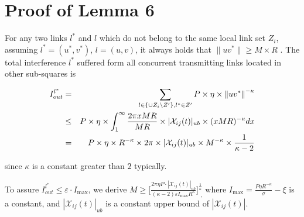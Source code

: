 \documentclass[journal]{IEEEtran}
\begin{document}
\section{Proof of Lemma 6}
\begin{IEEEproof}
For any two links $l^*$ and $ l$ which do not belong to the same local link set $Z_i$, assuming $l^*=(u^*, v^*)$,
$l=(u,v)$, it always holds that
   $\|uv^*\| \ge M \times R \mbox{~.}$
The total interference $l^*$ suffered form all concurrent transmitting links located in other sub-squares is

\vspace*{-0.5\baselineskip}
\begin{eqnarray*}
    I_{out}^ {l^\ast }
    &  =  & \sum\limits_{l\in \{\cup Z_i \backslash Z'\},l^\ast \in Z'}
                            P \times \eta \times \left\| {uv^\ast }\right\|^{-\kappa } \\
    & \le & P \times \eta \times \int_1^{\infty}{ \frac{2 \pi x M R}{M R} \times |\mathcal{X}_{ij} (t)|_{ub} \times
            (x M R)^{-\kappa} dx}  \\
     \vspace*{-0.5\baselineskip}
       & =   & P \times \eta \times R^{-\kappa} \times 2\pi \times |\mathcal{X}_{ij} (t)|_{ub} \times M^{-\kappa} \times \frac{1}{\kappa-2}
\end{eqnarray*}

since $\kappa$ is a constant greater than $2$ typically.

To assure $I_{out} ^ {l^\ast } \le \varepsilon \cdot I_{\max}$, we derive
{\small{$
    M \ge \biggl[ \frac{2 \pi \eta P \cdot |\mathcal{X}_{ij} (t)|_{ub}}{(\kappa-2) \varepsilon  I_{\max}R^{\kappa}} \biggr]^{\frac{1}{\kappa}}_{\mbox{~,}}$}}
where $I_{\max} = \frac{P \eta R^{-\kappa}}{\sigma} - \xi$ is a constant, and $|\mathcal{X}_{ij} (t)|_{ub} $ is a constant upper bound of $|\mathcal{X}_{ij} (t)|$.
\vspace*{-0.5\baselineskip}
\end{IEEEproof}
\end{document}
